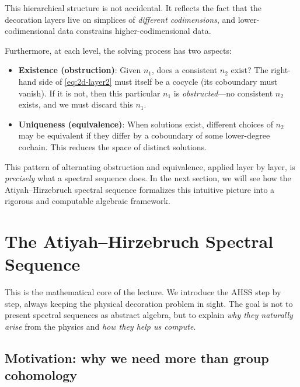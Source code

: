 \documentclass{SciPost}
\theoremstyle{definition}
\begin{document}
This hierarchical structure is not accidental.
It reflects the fact that the decoration layers live on simplices of \emph{different codimensions}, and lower-codimensional data constrains higher-codimensional data.

Furthermore, at each level, the solving process has two aspects:
\begin{itemize}
    \item \textbf{Existence (obstruction)}: Given $n_1$, does a consistent $n_2$ exist? The right-hand side of \eqref{eq:2d-layer2} must itself be a cocycle (its coboundary must vanish). If it is not, then this particular $n_1$ is \emph{obstructed}---no consistent $n_2$ exists, and we must discard this $n_1$.
    \item \textbf{Uniqueness (equivalence)}: When solutions exist, different choices of $n_2$ may be equivalent if they differ by a coboundary of some lower-degree cochain. This reduces the space of distinct solutions.
\end{itemize}

This pattern of alternating obstruction and equivalence, applied layer by layer, is \emph{precisely} what a spectral sequence does.
In the next section, we will see how the Atiyah--Hirzebruch spectral sequence formalizes this intuitive picture into a rigorous and computable algebraic framework.


\section{The Atiyah--Hirzebruch Spectral Sequence}
\label{sec:AHSS}

This is the mathematical core of the lecture.
We introduce the AHSS step by step, always keeping the physical decoration problem in sight.
The goal is not to present spectral sequences as abstract algebra, but to explain \emph{why they naturally arise} from the physics and \emph{how they help us compute}.

\subsection{Motivation: why we need more than group cohomology}
\label{subsec:motivation}
\end{document}
